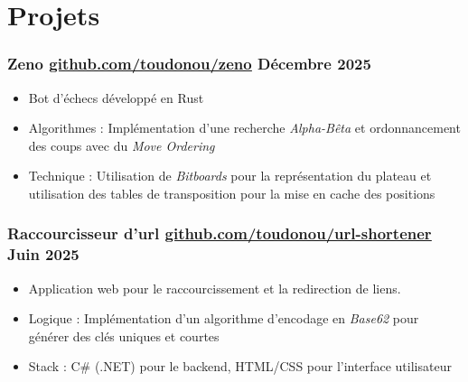 \documentclass[11pt]{article} %
\begin{document}
\section{Projets}

\subsubsection{Zeno \textbar{} \href{https://github.com/Toudonou/zeno}{\underline{github.com/toudonou/zeno}} \hfill Décembre 2025}
\begin{itemize}
	\item Bot d'échecs développé en Rust
	\item Algorithmes : Implémentation d'une recherche \textit{Alpha-Bêta} et ordonnancement des coups avec du \textit{Move Ordering}
	\item Technique : Utilisation de \textit{Bitboards} pour la représentation du plateau et utilisation des tables de transposition pour la mise en cache des positions
\end{itemize}

\subsubsection{Raccourcisseur d'url \textbar{} \href{https://github.com/Toudonou/url-shortener}{\underline{github.com/toudonou/url-shortener}} \hfill Juin 2025}
\begin{itemize}
	\item Application web pour le raccourcissement et la redirection de liens.
	\item Logique : Implémentation d'un algorithme d'encodage en \textit{Base62} pour générer des clés uniques et courtes
	\item Stack : C\# (.NET) pour le backend, HTML/CSS pour l'interface utilisateur
\end{itemize}

\end{document}
